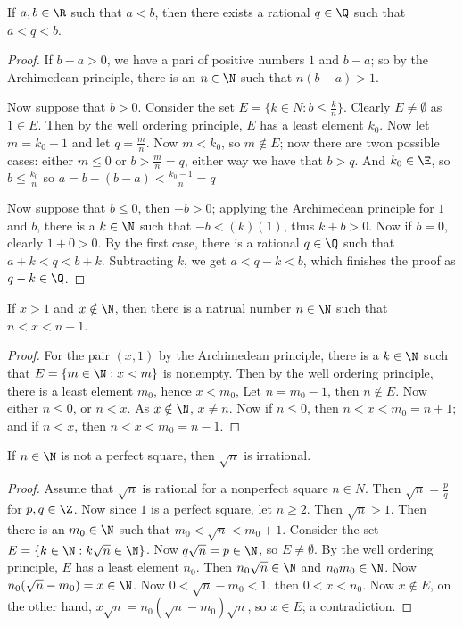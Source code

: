 \begin{theorem}
  If $a,b \in \R$ such that $a<b$, then there exists a rational $q \in \Q$ such that $a<q<b$.
\end{theorem}
\begin{proof}
  If $b-a>0$, we have a pari of positive numbers $1$ and $b-a$; so by the Archimedean principle, there is an $n \in \N$ such that $n(b-a)>1$.

  Now suppose that $b>0$. Consider the set $E=\{k \in N: b \leq \frac{k}{n}\}$. Clearly $E \neq \emptyset$ as $1 \in E$. 
  Then by the well ordering principle, $E$ has a least element $k_0$. Now let $m=k_0-1$ and let $q=\frac{m}{n}$. Now $m<k_0$, 
  so $m \notin E$; now there are twon possible cases: either $m \leq 0$ or $b>\frac{m}{n}=q$, either way we have that $b>q$. 
  And $k_0 \in \E$, so $b \leq \frac{k_0}{n}$ so $a=b-(b-a)<\frac{k_0-1}{n}=q$

  Now suppose that $b \leq 0$, then $-b>0$; applying the Archimedean principle for $1$ and $b$, there is a $k \in \N$ such 
  that $-b<(k)(1)$, thus $k+b>0$. Now if $b=0$, clearly $1+0>0$. By the first case, there is a rational $q \in \Q$ such that 
  $a+k<q<b+k$. Subtracting $k$, we get $a<q-k<b$, which finishes the proof as $q-k \in \Q$.
\end{proof}

\begin{remark}
  If $x>1$ and $x \notin \N$, then there is a natrual number $n \in \N$ such that $n<x<n+1$.
\end{remark}
\begin{proof}
  For the pair $(x,1)$ by the Archimedean principle, there is a $k \in \N$ such that $E=\{m \in \N: x<m\}$ is nonempty. Then 
  by the well ordering principle, there is a least element $m_0$, hence $x<m_0$, Let $n=m_0-1$, then $n \notin E$. Now either 
  $n \leq 0$, or $n<x$. As $x \notin \N$, $x \neq n$. Now if $n \leq 0$, then $n<x<m_0=n+1$; and if $n<x$, then $n<x<m_0=n-1$.
\end{proof}

\begin{remark}
  If $n \in \N$ is not a perfect square, then $\sqrt{n}$ is irrational.
\end{remark}
\begin{proof}
  Assume that $\sqrt{n}$ is rational for a nonperfect square $n \in N$. Then $\sqrt{n}=\frac{p}{q}$ for $p,q \in \Z$. Now 
  since $1$ is a perfect square, let $n \geq 2$. Then $\sqrt{n}>1$. Then there is an $m_0 \in \N$ such that $m_0<\sqrt{n}<m_0+1$. 
  Consider the set $E=\{k \in \N: k\sqrt{n} \in \N\}$. Now $q\sqrt{n}=p \in \N$, so $E \neq \emptyset$. By the well ordering principle, 
  $E$ has a least element $n_0$. Then $n_0\sqrt{n} \in \N$ and $n_0m_0 \in \N$. Now $n_0(\sqrt{n}-m_0)=x \in \N$. Now $0<\sqrt{n}-m_0<1$, 
  then $0<x<n_0$. Now $x \notin E$, on the other hand, $x\sqrt{n}=n_0(\sqrt{n}-m_0)\sqrt{n}$, so $x \in E$; a contradiction.
\end{proof}

